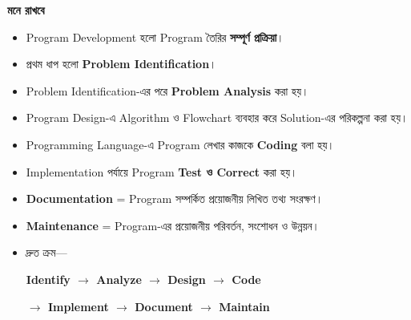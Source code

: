 \begin{rememberbox}

\textbf{\color{deepOrange}মনে রাখবে}

\begin{itemize}

\item Program Development হলো Program তৈরির
\textbf{সম্পূর্ণ প্রক্রিয়া}।

\item প্রথম ধাপ হলো
\textbf{Problem Identification}।

\item Problem Identification-এর পরে
\textbf{Problem Analysis} করা হয়।

\item Program Design-এ Algorithm ও Flowchart ব্যবহার করে
Solution-এর পরিকল্পনা করা হয়।

\item Programming Language-এ Program লেখার কাজকে
\textbf{Coding} বলা হয়।

\item Implementation পর্যায়ে Program
\textbf{Test ও Correct} করা হয়।

\item \textbf{Documentation} =
Program সম্পর্কিত প্রয়োজনীয় লিখিত তথ্য সংরক্ষণ।

\item \textbf{Maintenance} =
Program-এর প্রয়োজনীয় পরিবর্তন, সংশোধন ও উন্নয়ন।

\item দ্রুত ক্রম—

\begin{center}

\textbf{
Identify
\(\rightarrow\)
Analyze
\(\rightarrow\)
Design
\(\rightarrow\)
Code
}

\vspace{0.5mm}

\textbf{
\(\rightarrow\)
Implement
\(\rightarrow\)
Document
\(\rightarrow\)
Maintain
}

\end{center}

\end{itemize}

\end{rememberbox}

\small

